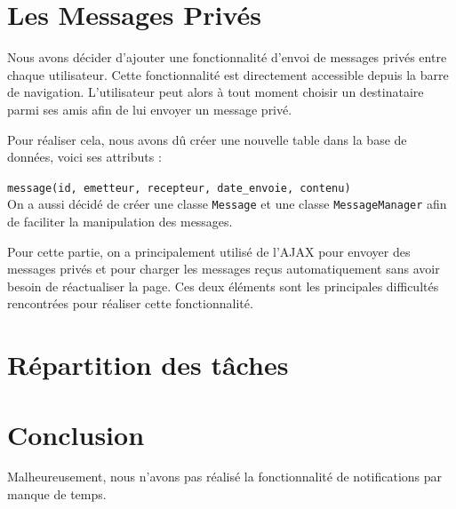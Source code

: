 \documentclass[a4paper, 12pt]{article}
\begin{document}
\newpage
\section{Les Messages Privés}	
Nous avons décider d'ajouter une fonctionnalité d'envoi de messages privés entre chaque utilisateur. 
Cette fonctionnalité est directement accessible depuis la barre de navigation. L'utilisateur peut alors à tout moment choisir un destinataire parmi ses amis afin de lui envoyer un message privé.

Pour réaliser cela, nous avons dû créer une nouvelle table dans la base de données, voici ses attributs :

 \texttt{message(id, emetteur, recepteur, date\_envoie, contenu)}\\		
On a aussi décidé de créer une classe \texttt{Message} et une classe \texttt{MessageManager} afin de faciliter la manipulation des messages. 

\vspace{2\baselineskip}

Pour cette partie, on a principalement utilisé de l'AJAX pour envoyer des messages privés et pour charger les messages reçus automatiquement sans avoir besoin de réactualiser la page. Ces deux éléments sont les principales difficultés rencontrées pour réaliser cette fonctionnalité.


\newpage		
\section{Répartition des tâches}
	
			
\section{Conclusion}			
Malheureusement, nous n'avons pas réalisé la fonctionnalité de notifications par manque de temps.
\end{document}
